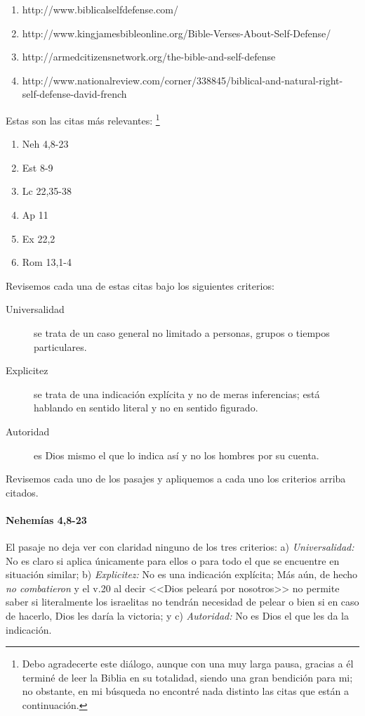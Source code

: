 \documentclass{article}
\begin{document}
\begin{enumerate}
\item http://www.biblicalselfdefense.com/
\item http://www.kingjamesbibleonline.org/Bible-Verses-About-Self-Defense/
\item http://armedcitizensnetwork.org/the-bible-and-self-defense
\item http://www.nationalreview.com/corner/338845/biblical-and-natural-right-self-defense-david-french
\end{enumerate}

\noindent
Estas son las citas m\'as relevantes:%
    \footnote{Debo agradecerte este diálogo, aunque con una muy larga pausa, gracias a él terminé de leer la Biblia en su totalidad, siendo una gran bendición para mi; no obstante, en mi búsqueda no encontré nada distinto las citas que están a continuación.}

\begin{enumerate}
\item Neh 4,8-23
\item Est 8-9
\item Lc 22,35-38
\item Ap 11
\item Ex 22,2
\item Rom 13,1-4
\end{enumerate}

\noindent
Revisemos cada una de estas citas bajo los siguientes criterios:

\begin{description}
\item[Universalidad] se trata de un caso general no limitado a personas, grupos o tiempos particulares.
\item[Explicitez] se trata de una indicaci\'{o}n expl\'{i}cita y no de meras inferencias; est\'a hablando en sentido literal y no en sentido figurado.
\item[Autoridad] es Dios mismo el que lo indica as\'{i} y no los hombres por su cuenta.
\end{description}

\noindent
Revisemos cada uno de los pasajes y apliquemos a cada uno los criterios arriba citados.

\paragraph{Nehem\'{i}as 4,8-23}

El pasaje no deja ver con claridad ninguno de los tres criterios: a) \emph{Universalidad:} No es claro si aplica \'unicamente para ellos o para todo el que se encuentre en situaci\'on similar; b) \emph{Explicitez:} No es una indicaci\'on expl\'{i}cita; M\'as a\'un, de hecho \emph{no combatieron} y el v.20 al decir <<Dios pelear\'a por nosotros>> no permite saber si literalmente los israelitas no tendr\'an necesidad de pelear o bien si en caso de hacerlo, Dios les dar\'{i}a la victoria; y c) \emph{Autoridad:} No es Dios el que les da la indicaci\'on.
\end{document}
